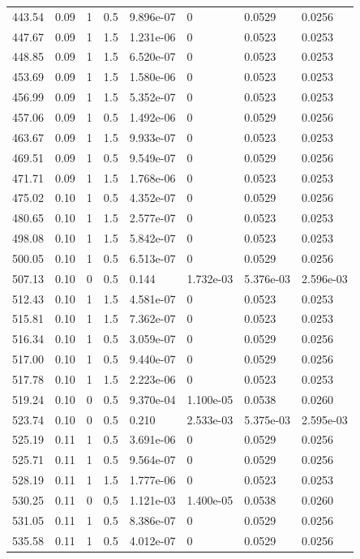 \documentclass[preview]{standalone}
\begin{document}
{{{\begin{tabular}{L{1.2cm}C{1.2cm} C{0.3cm}C{0.5cm} C{1.4cm}C{1.4cm} C{1.4cm}C{1.4cm}}
  443.54  &  0.09  & 1     & 0.5 &  9.896e-07  & 0  & 0.0529 &  0.0256   \\ 
  447.67  &  0.09  & 1     & 1.5 &  1.231e-06  & 0  & 0.0523 &  0.0253   \\ 
  448.85  &  0.09  & 1     & 1.5 &  6.520e-07  & 0  & 0.0523 &  0.0253   \\ 
  453.69  &  0.09  & 1     & 1.5 &  1.580e-06  & 0  & 0.0523 &  0.0253   \\ 
  456.99  &  0.09  & 1     & 1.5 &  5.352e-07  & 0  & 0.0523 &  0.0253   \\ 
  457.06  &  0.09  & 1     & 0.5 &  1.492e-06  & 0  & 0.0529 &  0.0256   \\ 
  463.67  &  0.09  & 1     & 1.5 &  9.933e-07  & 0  & 0.0523 &  0.0253   \\ 
  469.51  &  0.09  & 1     & 0.5 &  9.549e-07  & 0  & 0.0529 &  0.0256   \\ 
  471.71  &  0.09  & 1     & 1.5 &  1.768e-06  & 0  & 0.0523 &  0.0253   \\ 
  475.02  &  0.10  & 1     & 0.5 &  4.352e-07  & 0  & 0.0529 &  0.0256   \\ 
  480.65  &  0.10  & 1     & 1.5 &  2.577e-07  & 0  & 0.0523 &  0.0253   \\ 
  498.08  &  0.10  & 1     & 1.5 &  5.842e-07  & 0  & 0.0523 &  0.0253   \\ 
  500.05  &  0.10  & 1     & 0.5 &  6.513e-07  & 0  & 0.0529 &  0.0256   \\ 
  507.13  &  0.10  & 0     & 0.5 &  0.144  & 1.732e-03  & 5.376e-03 &  2.596e-03   \\ 
  512.43  &  0.10  & 1     & 1.5 &  4.581e-07  & 0  & 0.0523 &  0.0253   \\ 
  515.81  &  0.10  & 1     & 1.5 &  7.362e-07  & 0  & 0.0523 &  0.0253   \\ 
  516.34  &  0.10  & 1     & 0.5 &  3.059e-07  & 0  & 0.0529 &  0.0256   \\ 
  517.00  &  0.10  & 1     & 0.5 &  9.440e-07  & 0  & 0.0529 &  0.0256   \\ 
  517.78  &  0.10  & 1     & 1.5 &  2.223e-06  & 0  & 0.0523 &  0.0253   \\ 
  519.24  &  0.10  & 0     & 0.5 &  9.370e-04  & 1.100e-05  & 0.0538 &  0.0260   \\ 
  523.74  &  0.10  & 0     & 0.5 &  0.210  & 2.533e-03  & 5.375e-03 &  2.595e-03   \\ 
  525.19  &  0.11  & 1     & 0.5 &  3.691e-06  & 0  & 0.0529 &  0.0256   \\ 
  525.71  &  0.11  & 1     & 0.5 &  9.564e-07  & 0  & 0.0529 &  0.0256   \\ 
  528.19  &  0.11  & 1     & 1.5 &  1.777e-06  & 0  & 0.0523 &  0.0253   \\ 
  530.25  &  0.11  & 0     & 0.5 &  1.121e-03  & 1.400e-05  & 0.0538 &  0.0260   \\ 
  531.05  &  0.11  & 1     & 0.5 &  8.386e-07  & 0  & 0.0529 &  0.0256   \\ 
  535.58  &  0.11  & 1     & 0.5 &  4.012e-07  & 0  & 0.0529 &  0.0256   \\ 
\hline 
\end{tabular} 

}}}
\end{document}
